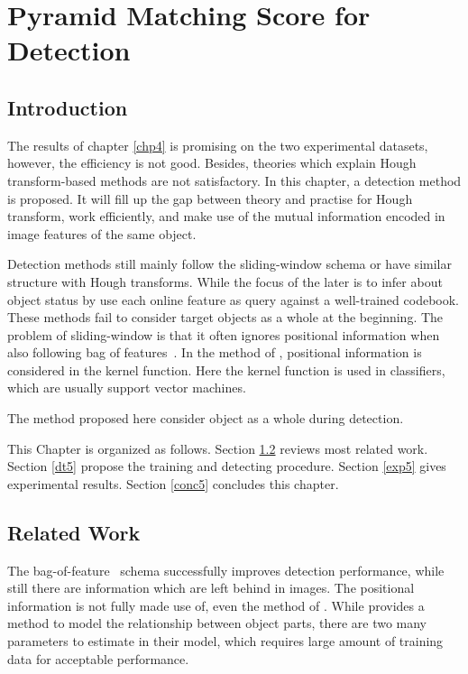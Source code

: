 \chapter{Pyramid Matching Score for Detection}
\label{chp5}

\section{Introduction}

The results of chapter \ref{chp4} is promising on the two experimental datasets, however, the efficiency is not good. Besides, theories which explain Hough transform-based methods are not satisfactory. In this chapter, a detection method is proposed. It will fill up the gap between theory and practise for Hough transform, work efficiently, and make use of the mutual information encoded in image features of the same object.

Detection methods still mainly follow the sliding-window schema or have similar structure with Hough transforms. While the focus of the later is to infer about object status by use each online feature as query against a well-trained codebook. These methods fail to consider target objects as a whole at the beginning. The problem of sliding-window is that it often ignores positional information when also following bag of features~\cite{bgf}. In the method of \cite{spmk}, positional information is considered in the kernel function. Here the kernel function\cite{kmts} is used in classifiers, which are usually support vector machines.

The method proposed here consider object as a whole during detection. 


This Chapter is organized as follows. Section \ref{rw5} reviews most related work. Section \ref{dt5} propose the training and detecting procedure. Section \ref{exp5} gives experimental results. Section \ref{conc5} concludes this chapter.

\section{Related Work}
\label{rw5}
The bag-of-feature~\cite{bgf} schema successfully improves detection performance, while still there are information which are left behind in images. The positional information is not fully made use of, even the method of \cite{kmts}. While \cite{uspl} provides a method to model the relationship between object parts, there are two many parameters to estimate in their model, which requires large amount of training data for acceptable performance.


